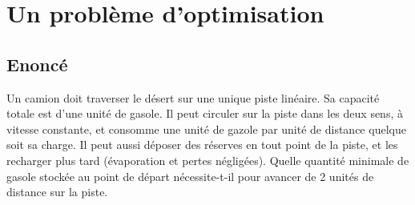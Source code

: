 \documentclass{article}
\newenvironment{statement}{\subsection{Enoncé}}{\pagebreak}
\begin{document}
\section{Un problème d'optimisation}
\begin{statement}
Un camion doit traverser le désert sur une unique piste linéaire. Sa capacité totale est d'une unité de gasole. Il peut circuler sur la piste dans les deux sens, à vitesse constante, et consomme une unité de gazole par unité de distance quelque soit sa charge. Il peut aussi déposer des réserves en tout point de la piste, et les recharger plus tard (évaporation et pertes négligées). Quelle quantité minimale de gasole stockée au point de départ nécessite-t-il pour avancer de 2 unités de distance sur la piste.
\end{statement}
\end{document}
